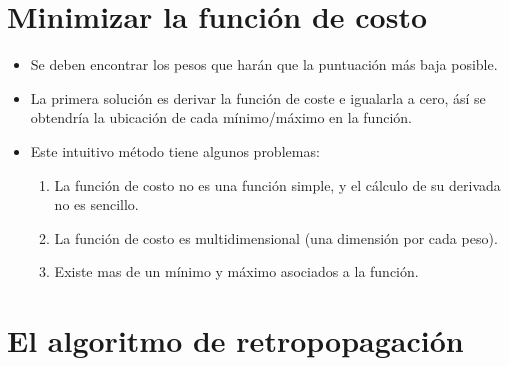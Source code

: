 \section{Minimizar la función de costo}
\begin{frame}{\titulo}{\subtitulo}
    \begin{itemize}
        \item Se deben encontrar los pesos que harán que la puntuación más baja posible.\bigskip

        \item La primera solución es derivar la función de coste e igualarla a cero, ásí se obtendría la ubicación de cada mínimo/máximo en la función.\bigskip

        \item Este intuitivo método tiene algunos problemas:
        \begin{enumerate}
            \item La función de costo no es una función simple, y el cálculo de su derivada no es sencillo.\medskip

            \item La función de costo es multidimensional (una dimensión por cada peso).\medskip

            \item Existe mas de un mínimo y máximo asociados a la función.
        \end{enumerate}
    \end{itemize}
\end{frame}

\section{El algoritmo de retropopagación}
\begin{frame}{\titulo}{\subtitulo}
    \begin{figure}[H]
        \centering
        \scalebox{0.6}{}
    \end{figure}
\end{frame}


